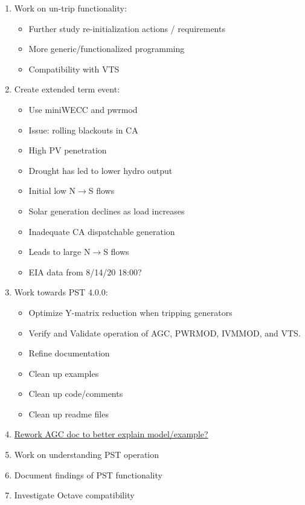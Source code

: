 \documentclass[12pt]{article}
\begin{document}
\begin{multicols}{2}
\begin{enumerate}
	\item Work on un-trip functionality:
		\begin{itemize}
				\footnotesize
				\itemsep0em
				\item Further study re-initialization actions / requirements
				\item More generic/functionalized programming
				\item Compatibility with VTS
			\end{itemize}
	\item Create extended term event:
		\begin{itemize}
			\footnotesize
			\itemsep0em
			\item Use miniWECC and pwrmod
			\item Issue: rolling blackouts in CA
			\item High PV penetration
			\item Drought has led to lower hydro output
			\item Initial low N$\longrightarrow$S flows
			\item Solar generation declines as load increases %
			\item Inadequate CA dispatchable generation %
			\item Leads to large N$\longrightarrow$S flows
			\item EIA data from 8/14/20 18:00? %
		\end{itemize}
	\item Work towards PST 4.0.0:
		\begin{itemize}
			\footnotesize
			\itemsep0em
			\item Optimize Y-matrix reduction when tripping generators
			\item Verify and Validate operation of AGC, PWRMOD, IVMMOD, and VTS.
			\item Refine documentation	
			\item Clean up examples
			\item Clean up code/comments
			\item Clean up readme files
		\end{itemize}
	\item \href{https://github.com/thadhaines/MT-Tech-SETO/blob/master/researchDocs/TEX/one-offs/200720-PSTandAGC/200720-PSTandAGC.pdf}{Rework AGC doc to better explain model/example?}
	\item Work on understanding PST operation
	\item Document findings of PST functionality
	\item Investigate Octave compatibility
\end{enumerate}



\end{multicols}
\end{document}
